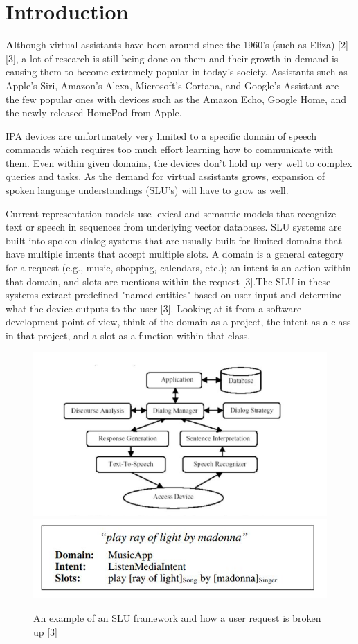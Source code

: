 \documentclass[letterpaper, 10 pt, conference]{IEEEtran}
\begin{document}
\section{Introduction}
\lettrine[findent=2pt]{\textbf{A}}{}lthough virtual assistants have been around since the 1960's (such as Eliza) [2][3], a lot of research is still being done on them and their growth in demand is causing them to become extremely popular in today's society. Assistants such as Apple's Siri, Amazon's Alexa, Microsoft's Cortana, and Google's Assistant are the few popular ones with devices such as the Amazon Echo, Google Home, and the newly released HomePod from Apple. \par IPA devices are unfortunately very limited to a specific domain of speech commands which requires too much effort learning how to communicate with them. Even within given domains, the devices don't hold up very well to complex queries and tasks. As the demand for virtual assistants grows, expansion of spoken language understandings (SLU's) will have to grow as well. 
\par Current representation models use lexical and semantic models that recognize text or speech in sequences from underlying vector databases. SLU systems are built into spoken dialog systems that are usually built for limited domains that have multiple intents that accept multiple slots. A domain is a general category for a request (e.g., music, shopping, calendars, etc.); an intent is an action within that domain, and slots are mentions within the request [3].The SLU in these systems extract predefined "named entities" based on user input and determine what the device outputs to the user [3]. Looking at it from a software development point of view, think of the domain as a project, the intent as a class in that project, and a slot as a function within that class.

\begin{figure}[!ht]
\centering
\renewcommand\figurename{Fig.}
\includegraphics[width=\columnwidth]{SLU4.png}
\includegraphics[width=\columnwidth]{SLU.png}
\caption{An example of an SLU framework and how a user request is broken up [3]}
\end{figure}
\end{document}

